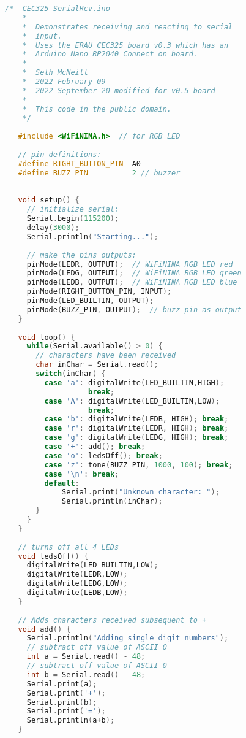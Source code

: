 \begin{lstlisting}[language=C++, caption={This sketch shows controlling parts of the 
    board using input from the serial port. Remember, don't copy and paste from a PDF
    since that process garbles some of the characters.},label={lst:serialreceiveexample}]
    /*  CEC325-SerialRcv.ino
    *  
    *  Demonstrates receiving and reacting to serial
    *  input.
    *  Uses the ERAU CEC325 board v0.3 which has an 
    *  Arduino Nano RP2040 Connect on board.
    *  
    *  Seth McNeill
    *  2022 February 09
    *  2022 September 20 modified for v0.5 board
    *  
    *  This code in the public domain.
    */
   
   #include <WiFiNINA.h>  // for RGB LED
   
   // pin definitions:
   #define RIGHT_BUTTON_PIN  A0 
   #define BUZZ_PIN          2 // buzzer
   
   
   void setup() {
     // initialize serial:
     Serial.begin(115200);
     delay(3000);
     Serial.println("Starting...");
     
     // make the pins outputs:
     pinMode(LEDR, OUTPUT);  // WiFiNINA RGB LED red
     pinMode(LEDG, OUTPUT);  // WiFiNINA RGB LED green
     pinMode(LEDB, OUTPUT);  // WiFiNINA RGB LED blue
     pinMode(RIGHT_BUTTON_PIN, INPUT);  
     pinMode(LED_BUILTIN, OUTPUT);
     pinMode(BUZZ_PIN, OUTPUT);  // buzz pin as output
   }
   
   void loop() {
     while(Serial.available() > 0) {  
       // characters have been received
       char inChar = Serial.read();
       switch(inChar) {
         case 'a': digitalWrite(LED_BUILTIN,HIGH); 
                   break;
         case 'A': digitalWrite(LED_BUILTIN,LOW); 
                   break;
         case 'b': digitalWrite(LEDB, HIGH); break;
         case 'r': digitalWrite(LEDR, HIGH); break;
         case 'g': digitalWrite(LEDG, HIGH); break;
         case '+': add(); break;
         case 'o': ledsOff(); break;
         case 'z': tone(BUZZ_PIN, 1000, 100); break;
         case '\n': break;
         default: 
             Serial.print("Unknown character: "); 
             Serial.println(inChar);
       }
     }
   }
   
   // turns off all 4 LEDs
   void ledsOff() {
     digitalWrite(LED_BUILTIN,LOW);
     digitalWrite(LEDR,LOW);
     digitalWrite(LEDG,LOW);
     digitalWrite(LEDB,LOW);
   }
   
   // Adds characters received subsequent to +
   void add() {
     Serial.println("Adding single digit numbers");
     // subtract off value of ASCII 0
     int a = Serial.read() - 48; 
     // subtract off value of ASCII 0
     int b = Serial.read() - 48; 
     Serial.print(a);
     Serial.print('+');
     Serial.print(b);
     Serial.print('=');
     Serial.println(a+b);
   }   
\end{lstlisting}


